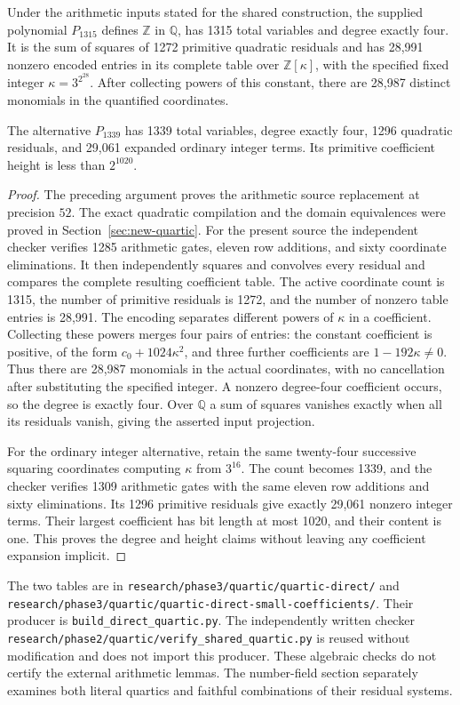 \begin{theorem}\label{thm:p3-quartic1315}
Under the arithmetic inputs stated for the shared construction,
the supplied polynomial $P_{1315}$ defines $\mathbb Z$ in
$\mathbb Q$, has 1315 total variables and degree exactly four.
It is the sum of squares of 1272 primitive quadratic residuals
and has 28,991 nonzero encoded entries in its complete table over
$\mathbb Z[\kappa]$, with the specified fixed integer
$\kappa=3^{2^{28}}$. After collecting powers of this constant,
there are 28,987 distinct monomials in the quantified coordinates.

The alternative $P_{1339}$ has 1339 total variables, degree
exactly four, 1296 quadratic residuals, and 29,061 expanded
ordinary integer terms. Its primitive coefficient height is
less than $2^{1020}$.
\end{theorem}
\begin{proof}
The preceding argument proves the arithmetic source replacement
at precision $52$. The exact quadratic compilation and the
domain equivalences were proved in Section~\ref{sec:new-quartic}.
For the present source the independent checker verifies 1285
arithmetic gates, eleven row additions, and sixty coordinate
eliminations. It then independently squares and convolves every
residual and compares the complete resulting coefficient table.
The active coordinate count is 1315, the number of primitive
residuals is 1272, and the number of nonzero table entries is
28,991. The encoding separates different powers of $\kappa$
in a coefficient. Collecting these powers merges four pairs of
entries: the constant coefficient is positive, of the form
$c_0+1024\kappa^2$, and three further coefficients are
$1-192\kappa\ne0$. Thus there are 28,987 monomials in the
actual coordinates, with no cancellation after substituting the
specified integer. A nonzero degree-four coefficient occurs, so the degree
is exactly four. Over $\mathbb Q$ a sum of squares vanishes
exactly when all its residuals vanish, giving the asserted
input projection.

For the ordinary integer alternative, retain the same twenty-four
successive squaring coordinates computing $\kappa$ from $3^{16}$.
The count becomes 1339, and the checker verifies 1309 arithmetic
gates with the same eleven row additions and sixty eliminations.
Its 1296 primitive residuals give exactly 29,061 nonzero integer
terms. Their largest coefficient has bit length at most 1020,
and their content is one. This proves the degree and height
claims without leaving any coefficient expansion implicit.
\end{proof}

The two tables are in
\nolinkurl{research/phase3/quartic/quartic-direct/} and
\nolinkurl{research/phase3/quartic/quartic-direct-small-coefficients/}.
Their producer is \nolinkurl{build_direct_quartic.py}.
The independently written checker
\nolinkurl{research/phase2/quartic/verify_shared_quartic.py}
is reused without modification and does not import this producer.
These algebraic checks do not certify the external arithmetic
lemmas. The number-field section separately examines both
literal quartics and faithful combinations of their residual systems.
